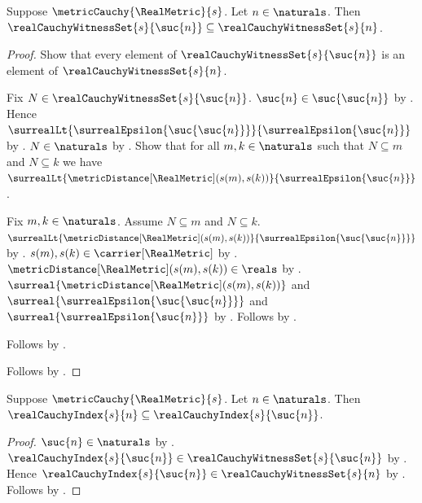 \begin{proposition}\label{real_cauchy_witness_sets_antitone}
    Suppose $\metricCauchy{\RealMetric}{s}$.
    Let $n\in\naturals$.
    Then $\realCauchyWitnessSet{s}{\suc{n}}
        \subseteq\realCauchyWitnessSet{s}{n}$.
\end{proposition}
\begin{proof}
    Show that every element of
        $\realCauchyWitnessSet{s}{\suc{n}}$ is an element of
        $\realCauchyWitnessSet{s}{n}$.
    \begin{subproof}
        Fix $N\in\realCauchyWitnessSet{s}{\suc{n}}$.
        $\suc{n}\in\suc{\suc{n}}$ by .
        Hence
            $\surrealLt{\surrealEpsilon{\suc{\suc{n}}}}
                {\surrealEpsilon{\suc{n}}}$
            by .
        $N\in\naturals$ by .
        Show that for all $m,k\in\naturals$ such that
            $N\subseteq m$ and $N\subseteq k$ we have
            $\surrealLt{\metricDistance[\RealMetric](s(m),s(k))}
                {\surrealEpsilon{\suc{n}}}$.
        \begin{subproof}
            Fix $m,k\in\naturals$.
            Assume $N\subseteq m$ and $N\subseteq k$.
            $\surrealLt{\metricDistance[\RealMetric](s(m),s(k))}
                {\surrealEpsilon{\suc{\suc{n}}}}$
                by .
            $s(m),s(k)\in\carrier[\RealMetric]$
                by .
            $\metricDistance[\RealMetric](s(m),s(k))\in\reals$
                by .
            $\surreal{\metricDistance[\RealMetric](s(m),s(k))}$ and
                $\surreal{\surrealEpsilon{\suc{\suc{n}}}}$ and
                $\surreal{\surrealEpsilon{\suc{n}}}$
                by
                .
            Follows by .
        \end{subproof}
        Follows by .
    \end{subproof}
    Follows by .
\end{proof}

\begin{proposition}\label{real_cauchy_index_monotone}
    Suppose $\metricCauchy{\RealMetric}{s}$.
    Let $n\in\naturals$.
    Then $\realCauchyIndex{s}{n}\subseteq
        \realCauchyIndex{s}{\suc{n}}$.
\end{proposition}
\begin{proof}
    $\suc{n}\in\naturals$ by .
    $\realCauchyIndex{s}{\suc{n}}
        \in\realCauchyWitnessSet{s}{\suc{n}}$
        by .
    Hence $\realCauchyIndex{s}{\suc{n}}
        \in\realCauchyWitnessSet{s}{n}$
        by .
    Follows by .
\end{proof}

